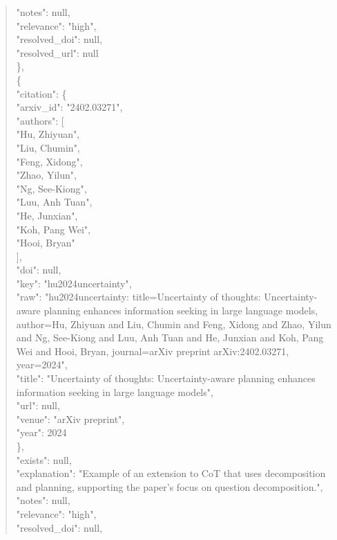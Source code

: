 \documentclass[11pt]{article}
\begin{document}
\begin{quote}
      "notes": null,\\
      "relevance": "high",\\
      "resolved\_doi": null,\\
      "resolved\_url": null\\
    \},\\
    \{\\
      "citation": \{\\
        "arxiv\_id": "2402.03271",\\
        "authors": [\\
          "Hu, Zhiyuan",\\
          "Liu, Chumin",\\
          "Feng, Xidong",\\
          "Zhao, Yilun",\\
          "Ng, See-Kiong",\\
          "Luu, Anh Tuan",\\
          "He, Junxian",\\
          "Koh, Pang Wei",\\
          "Hooi, Bryan"\\
        ],\\
        "doi": null,\\
        "key": "hu2024uncertainty",\\
        "raw": "hu2024uncertainty: title=Uncertainty of thoughts: Uncertainty-aware planning enhances information seeking in large language models, author=Hu, Zhiyuan and Liu, Chumin and Feng, Xidong and Zhao, Yilun and Ng, See-Kiong and Luu, Anh Tuan and He, Junxian and Koh, Pang Wei and Hooi, Bryan, journal=arXiv preprint arXiv:2402.03271, year=2024",\\
        "title": "Uncertainty of thoughts: Uncertainty-aware planning enhances information seeking in large language models",\\
        "url": null,\\
        "venue": "arXiv preprint",\\
        "year": 2024\\
      \},\\
      "exists": null,\\
      "explanation": "Example of an extension to CoT that uses decomposition and planning, supporting the paper's focus on question decomposition.",\\
      "notes": null,\\
      "relevance": "high",\\
      "resolved\_doi": null,\\

\end{quote}
\end{document}
